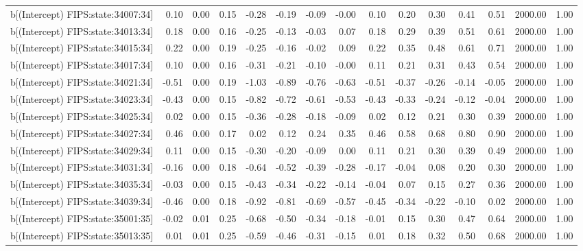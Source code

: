 \begin{table}[ht]
\begin{tabular}{rrrrrrrrrrrrrrr}
  b[(Intercept) FIPS:state:34007:34] & 0.10 & 0.00 & 0.15 & -0.28 & -0.19 & -0.09 & -0.00 & 0.10 & 0.20 & 0.30 & 0.41 & 0.51 & 2000.00 & 1.00 \\ 
  b[(Intercept) FIPS:state:34013:34] & 0.18 & 0.00 & 0.16 & -0.25 & -0.13 & -0.03 & 0.07 & 0.18 & 0.29 & 0.39 & 0.51 & 0.61 & 2000.00 & 1.00 \\ 
  b[(Intercept) FIPS:state:34015:34] & 0.22 & 0.00 & 0.19 & -0.25 & -0.16 & -0.02 & 0.09 & 0.22 & 0.35 & 0.48 & 0.61 & 0.71 & 2000.00 & 1.00 \\ 
  b[(Intercept) FIPS:state:34017:34] & 0.10 & 0.00 & 0.16 & -0.31 & -0.21 & -0.10 & -0.00 & 0.11 & 0.21 & 0.31 & 0.43 & 0.54 & 2000.00 & 1.00 \\ 
  b[(Intercept) FIPS:state:34021:34] & -0.51 & 0.00 & 0.19 & -1.03 & -0.89 & -0.76 & -0.63 & -0.51 & -0.37 & -0.26 & -0.14 & -0.05 & 2000.00 & 1.00 \\ 
  b[(Intercept) FIPS:state:34023:34] & -0.43 & 0.00 & 0.15 & -0.82 & -0.72 & -0.61 & -0.53 & -0.43 & -0.33 & -0.24 & -0.12 & -0.04 & 2000.00 & 1.00 \\ 
  b[(Intercept) FIPS:state:34025:34] & 0.02 & 0.00 & 0.15 & -0.36 & -0.28 & -0.18 & -0.09 & 0.02 & 0.12 & 0.21 & 0.30 & 0.39 & 2000.00 & 1.00 \\ 
  b[(Intercept) FIPS:state:34027:34] & 0.46 & 0.00 & 0.17 & 0.02 & 0.12 & 0.24 & 0.35 & 0.46 & 0.58 & 0.68 & 0.80 & 0.90 & 2000.00 & 1.00 \\ 
  b[(Intercept) FIPS:state:34029:34] & 0.11 & 0.00 & 0.15 & -0.30 & -0.20 & -0.09 & 0.00 & 0.11 & 0.21 & 0.30 & 0.39 & 0.49 & 2000.00 & 1.00 \\ 
  b[(Intercept) FIPS:state:34031:34] & -0.16 & 0.00 & 0.18 & -0.64 & -0.52 & -0.39 & -0.28 & -0.17 & -0.04 & 0.08 & 0.20 & 0.30 & 2000.00 & 1.00 \\ 
  b[(Intercept) FIPS:state:34035:34] & -0.03 & 0.00 & 0.15 & -0.43 & -0.34 & -0.22 & -0.14 & -0.04 & 0.07 & 0.15 & 0.27 & 0.36 & 2000.00 & 1.00 \\ 
  b[(Intercept) FIPS:state:34039:34] & -0.46 & 0.00 & 0.18 & -0.92 & -0.81 & -0.69 & -0.57 & -0.45 & -0.34 & -0.22 & -0.10 & 0.02 & 2000.00 & 1.00 \\ 
  b[(Intercept) FIPS:state:35001:35] & -0.02 & 0.01 & 0.25 & -0.68 & -0.50 & -0.34 & -0.18 & -0.01 & 0.15 & 0.30 & 0.47 & 0.64 & 2000.00 & 1.00 \\ 
  b[(Intercept) FIPS:state:35013:35] & 0.01 & 0.01 & 0.25 & -0.59 & -0.46 & -0.31 & -0.15 & 0.01 & 0.18 & 0.32 & 0.50 & 0.68 & 2000.00 & 1.00 \\ 

\end{tabular}
\end{table}

